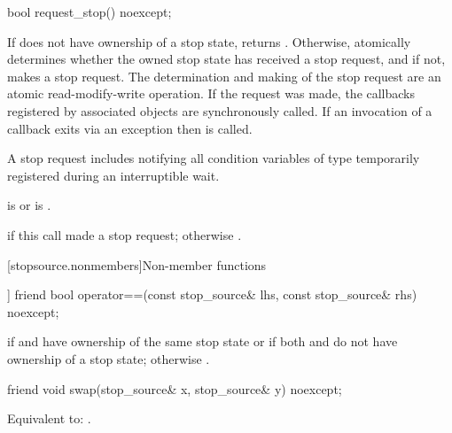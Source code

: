 %
\begin{itemdecl}
bool request_stop() noexcept;
\end{itemdecl}

\begin{itemdescr}
\pnum
\effects
If  does not have ownership of a stop state, returns .
Otherwise, atomically determines whether the owned stop state
has received a stop request,
and if not, makes a stop request.
The determination and making of the stop request are an
atomic read-modify-write operation.
If the request was made,
the callbacks registered by associated  objects
are synchronously called.
If an invocation of a callback exits via an exception
then  is called.
\begin{note}
A stop request includes notifying all condition variables
of type 
temporarily registered during
an interruptible wait.
\end{note}

\pnum
\ensures
{} is 
or  is .

\pnum
\returns
{} if this call made a stop request;
otherwise .
\end{itemdescr}

[stopsource.nonmembers]{Non-member functions}

%
\begin{itemdecl}
[[nodiscard]] friend bool
  operator==(const stop_source& lhs, const stop_source& rhs) noexcept;
\end{itemdecl}

\begin{itemdescr}
\pnum
\returns
{} if  and  have ownership
of the same stop state
or if both  and  do not have ownership of a stop state;
otherwise .
\end{itemdescr}

%
\begin{itemdecl}
friend void swap(stop_source& x, stop_source& y) noexcept;
\end{itemdecl}

\begin{itemdescr}
\pnum
\effects
Equivalent to: .
\end{itemdescr}

